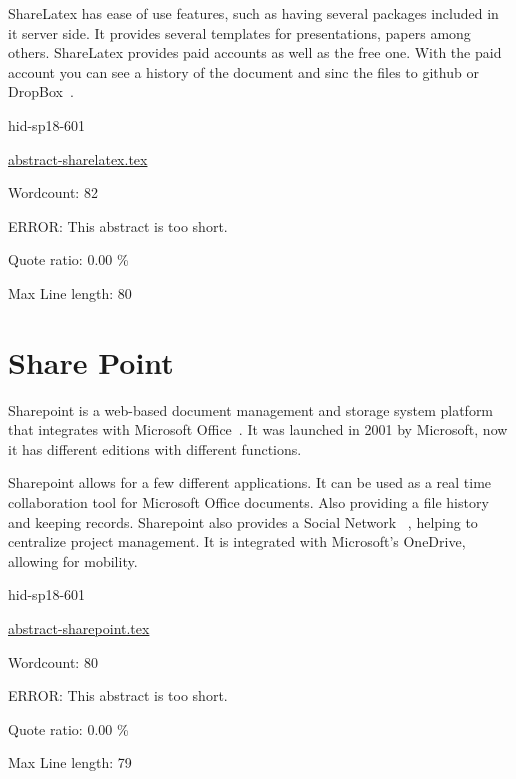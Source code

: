 ShareLatex has ease of use features, such as having several packages included 
in it server side. It provides several templates for presentations, papers among
 others. ShareLatex provides paid accounts as well as the free one. With the 
 paid account you can see a history of the document and sinc the files to github
 or DropBox~\cite{hid-sp18-601-www-slatex-plans}.


\begin{IU}

hid-sp18-601

\href{https://github.com/cloudmesh-community/hid-sp18-601/blob/master//technology/abstract-sharelatex.tex}{abstract-sharelatex.tex}

 

Wordcount: 82

ERROR: This abstract is too short.


Quote ratio: 0.00 \%
 
Max Line length: 80
\end{IU}

\section{Share Point}

Sharepoint is a web-based document management and storage system platform that 
integrates with Microsoft Office~\cite{hid-sp18-601-www-spoint-website}. It was
 launched in 2001 by Microsoft, now it 
has different editions with different functions.

Sharepoint allows for a few different applications. It can be used as a real 
time collaboration tool for Microsoft Office documents. Also providing a 
file history and keeping records. Sharepoint also provides a Social Network 
~\cite{hid-sp18-601-www-spoint-new-sharepoint}, 
helping to centralize project management. It is integrated with Microsoft's 
OneDrive, allowing for mobility.

\begin{IU}

hid-sp18-601

\href{https://github.com/cloudmesh-community/hid-sp18-601/blob/master//technology/abstract-sharepoint.tex}{abstract-sharepoint.tex}

 

Wordcount: 80

ERROR: This abstract is too short.


Quote ratio: 0.00 \%
 
Max Line length: 79
\end{IU}

